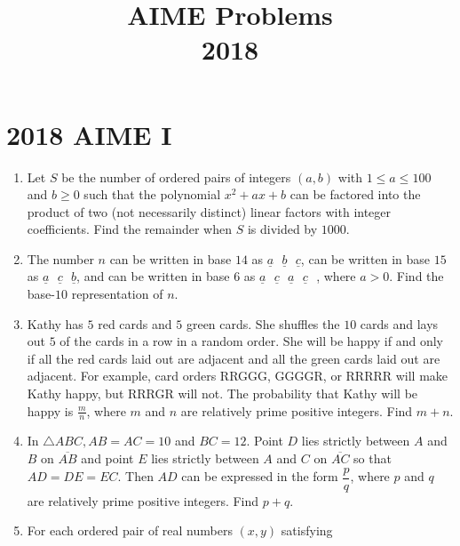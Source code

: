 \documentclass{article}
\title{AIME Problems \\ 2018}
\date{}
\begin{document}
\maketitle\thispagestyle{fancy}\newpage\section*{2018 AIME I}\begin{enumerate}[label=\arabic*., itemsep=0.5em]\item Let \(S\) be the number of ordered pairs of integers \((a,b)\) with \(1 \leq a \leq 100\) and \(b \geq 0\) such that the polynomial \(x^2+ax+b\) can be factored into the product of two (not necessarily distinct) linear factors with integer coefficients. Find the remainder when \(S\) is divided by \(1000\).\par \vspace{0.5em}\item The number \(n\) can be written in base \(14\) as \(\underline{a}\text{ }\underline{b}\text{ }\underline{c}\), can be written in base \(15\) as \(\underline{a}\text{ }\underline{c}\text{ }\underline{b}\), and can be written in base \(6\) as \(\underline{a}\text{ }\underline{c}\text{ }\underline{a}\text{ }\underline{c}\text{ }\), where \(a > 0\). Find the base-\(10\) representation of \(n\).\par \vspace{0.5em}\item Kathy has \(5\) red cards and \(5\) green cards. She shuffles the \(10\) cards and lays out \(5\) of the cards in a row in a random order. She will be happy if and only if all the red cards laid out are adjacent and all the green cards laid out are adjacent. For example, card orders RRGGG, GGGGR, or RRRRR will make Kathy happy, but RRRGR will not. The probability that Kathy will be happy is \( \frac{m}{n}\), where \(m\) and \(n\) are relatively prime positive integers. Find \(m + n\).\par \vspace{0.5em}\item In \(\triangle ABC, AB = AC = 10\) and \(BC = 12\). Point \(D\) lies strictly between \(A\) and \(B\) on \(\overline{AB}\) and point \(E\) lies strictly between \(A\) and \(C\) on \(\overline{AC}\) so that \(AD = DE = EC\). Then \(AD\) can be expressed in the form \(\dfrac{p}{q}\), where \(p\) and \(q\) are relatively prime positive integers. Find \(p+q\).\par \vspace{0.5em}\item For each ordered pair of real numbers \((x,y)\) satisfying


\end{enumerate}
\end{document}
